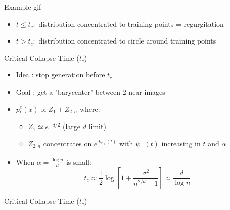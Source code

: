 \documentclass[aspectratio=169]{beamer}
\begin{document}
\begin{frame}{Example gif}
    \begin{itemize}
    \end{itemize}
    \begin{center}
    \end{center}
    \begin{itemize}
        \item $t \leq t_c :$ distribution concentrated to training points = regurgitation
        \item $t > t_c :$ distribution concentrated to circle around training points
    \end{itemize}
\end{frame}


\begin{frame}{Critical Collapse Time ($t_c$)}
    \begin{itemize}
        \item Idea : stop generation before $t_c$
        \item Goal : get a "barycenter" between 2 near images
        \item $p_t^e(x) \propto Z_1 + Z_{2:n}$ where:
        \begin{itemize}
            \item $Z_1 \simeq e^{-d/2}$ (large $d$ limit)
            \item $Z_{2:n}$ concentrates on $e^{d\psi_+(t)}$ with $\psi_+(t)$ increasing in $t$ and $\alpha$
        \end{itemize}
        \item When $\alpha = \frac{\log n}{d}$ is small:
        \begin{equation}
            t_c \approx \frac{1}{2}\log\left[1+\frac{\sigma^2}{n^{2/d}-1}\right] \approx \frac{d}{\log n}
        \end{equation}
    \end{itemize}
\end{frame}

\begin{frame}{Critical Collapse Time ($t_c$)}
    \begin{center}
    \end{center}
\end{frame}
\end{document}
